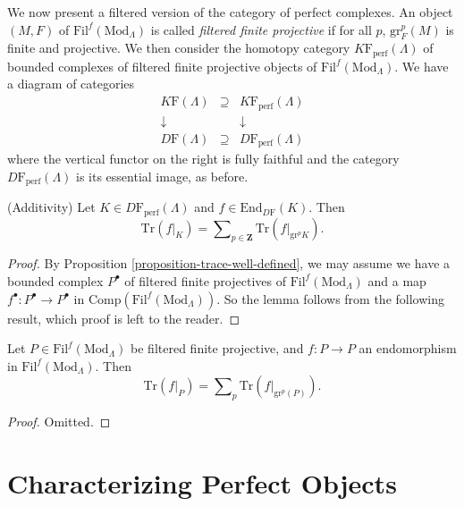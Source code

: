 \noindent
We now present a filtered version of the category of perfect complexes. An
object $(M,F)$ of $\text{Fil}^f(\text{Mod}_\Lambda)$ is called {\it filtered
finite projective} if for all $p$, $\text{gr}^p_F (M)$ is finite and
projective. We then consider the homotopy category
$K\mathrm{F}_{\text{perf}}(\Lambda)$ of bounded complexes of filtered finite
projective objects of $\text{Fil}^f(\text{Mod}_\Lambda)$. We have a diagram of
categories
$$
\begin{matrix}
K\mathrm{F}(\Lambda) & \supseteq & K\mathrm{F}_{\text{perf}}(\Lambda)\\
\downarrow & & \downarrow\\
D\mathrm{F}(\Lambda) & \supseteq & D\mathrm{F}_{\text{perf}}(\Lambda)
\end{matrix}
$$
where the vertical functor on the right is fully faithful and the category
$D\mathrm{F}_{\text{perf}}(\Lambda)$ is its essential image, as before.

\begin{lemma}
\label{lemma-additivity}
(Additivity)
Let $K\in D\mathrm{F}_{\text{perf}}(\Lambda)$ and $f\in
\text{End}_{D\mathrm{F}}(K)$. Then
$$
\text{Tr}(f|_K) =
\sum\nolimits_{p\in \mathbf{Z}} \text{Tr}(f|_{\text{gr}^p K}).
$$
\end{lemma}

\begin{proof}
By Proposition \ref{proposition-trace-well-defined}, we may assume we have
a bounded
complex $P^\bullet$ of filtered finite projectives of
$\text{Fil}^f(\text{Mod}_\Lambda)$ and a map $f^\bullet: P^\bullet\to
P^\bullet$ in $\text{Comp}(\text{Fil}^f(\text{Mod}_\Lambda))$. So the lemma
follows from the following result, which proof is left to the reader.
\end{proof}

\begin{lemma}
\label{lemma-additive-filtered-finite-projective}
Let $P \in \text{Fil}^f(\text{Mod}_\Lambda)$ be filtered finite projective, and
$f: P \to P$ an endomorphism in $\text{Fil}^f(\text{Mod}_\Lambda)$. Then
$$
\text{Tr}(f|_P) =
\sum\nolimits_p \text{Tr}(f|_{\text{gr}^p(P)}).
$$
\end{lemma}

\begin{proof}
Omitted.
\end{proof}







\section{Characterizing Perfect Objects}
\label{section-characterizing-perfect}

